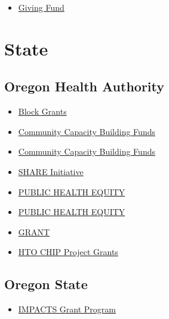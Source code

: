 \documentclass[
  letterpaper,
  DIV=11,
  numbers=noendperiod]{scrreprt}
\providecommand{\tightlist}{%
  \setlength{\itemsep}{0pt}\setlength{\parskip}{0pt}}\usepackage{longtable,booktabs,array}
\begin{document}
\begin{itemize}
\tightlist
\item
  \href{https://www.weyerhaeuser.com/company/values/citizenship/giving-fund/}{Giving
  Fund}
\end{itemize}

\section{State}\label{state}

\subsection{Oregon Health Authority}\label{oregon-health-authority}

\begin{itemize}
\tightlist
\item
  \href{https://www.oregon.gov/oha/hsd/amhpac/pages/block-grants.aspx}{Block
  Grants}
\item
  \href{https://www.oregon.gov/oha/hsd/medicaid-policy/pages/ccbf.aspx}{Community
  Capacity Building Funds}
\item
  \href{https://content.govdelivery.com/accounts/ORHA/bulletins/38e15e8}{Community
  Capacity Building Funds}
\item
  \href{https://www.oregon.gov/oha/hpa/dsi-tc/pages/share.aspx}{SHARE
  Initiative}
\item
  \href{https://www.oregon.gov/oha/PH/ABOUT/MODCET\%20CBO\%20Documents/PH\%20Equity\%20CBO\%20Fiscal\%20Guidance\%20-\%20AY25\%20\%20DRAFT-\%2002.28.24.pdf}{PUBLIC
  HEALTH EQUITY}
\item
  \href{https://content.govdelivery.com/accounts/ORHA/bulletins/37611cc}{PUBLIC
  HEALTH EQUITY}
\item
  \href{https://www.oregon.gov/oha/ph/healthypeoplefamilies/youth/healthschool/schoolbasedhealthcenters/pages/mh-expansion-grant.aspx}{GRANT}
\item
  \href{https://www.oregon.gov/oha/PH/ABOUT/Documents/HTO\%20CHIP\%202024\%20FAQ.pdf}{HTO
  CHIP Project Grants}
\end{itemize}

\subsection{Oregon State}\label{oregon-state}

\begin{itemize}
\tightlist
\item
  \href{https://www.oregon.gov/cjc/impacts/Documents/2020_IMPACTSOnePager.pdf}{IMPACTS
  Grant Program}
\end{itemize}
\end{document}
